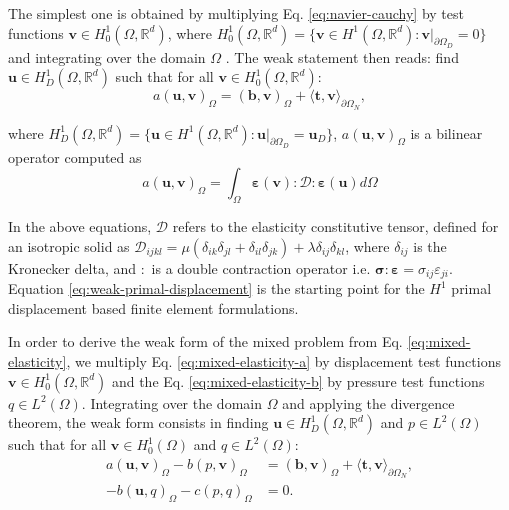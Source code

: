 \documentclass[english,11pt,3p,number,sort&compress]{elsarticle}
\begin{document}
The simplest one is obtained by multiplying Eq. \eqref{eq:navier-cauchy} by test functions $\bm{v} \in H^1_0(\Omega,\mathbb{R}^d)$, where $H^1_0(\Omega,\mathbb{R}^d)=\{\bm{v} \in H^1(\Omega,\mathbb{R}^d) : \bm{v} \lvert_{\partial\Omega_D}=0 \}$ and integrating over the domain $\Omega$ \cite{becker1981finite}. The weak statement then reads: find $\mathbf{u} \in H^1_D(\Omega,\mathbb{R}^d)$ such that for all $\mathbf{v} \in H^1_0(\Omega,\mathbb{R}^d)$:
\begin{equation} \label{eq:weak-primal-displacement}
    a\left(\bm{u},\bm{v}\right)_\Omega = \left(\bm{b},\bm{v}\right)_\Omega + \langle\bm{t},\bm{v}\rangle_{\partial\Omega_N},
\end{equation}

\noindent where $H^1_D(\Omega,\mathbb{R}^d)=\{\bm{u} \in H^1(\Omega,\mathbb{R}^d) : \bm{u} \lvert_{\partial\Omega_D}=\bm{u}_D\}$, $a\left(\bm{u},\bm{v}\right)_\Omega$ is a bilinear operator computed as
\begin{equation*}
	a\left(\bm{u},\bm{v}\right)_\Omega = \int_{\Omega} \bm{\varepsilon}(\bm{v}) : \mathcal{D} : \bm{\varepsilon}(\bm{u}) d\Omega
\end{equation*}

In the above equations, $\mathcal{D}$ refers to the elasticity constitutive tensor, defined for an isotropic solid as $\mathcal{D}_{ijkl} = \mu(\delta_{ik}\delta_{jl}+\delta_{il}\delta_{jk})+\lambda\delta_{ij}\delta_{kl}$, where $\delta_{ij}$ is the Kronecker delta, and $:$ is a double contraction operator i.e. $\bm{\sigma}:\bm{\varepsilon} = \sigma_{ij}\varepsilon_{ji}$. Equation \eqref{eq:weak-primal-displacement} is the starting point for the $H^1$ primal displacement based finite element formulations.

In order to derive the weak form of the mixed problem from Eq. \eqref{eq:mixed-elasticity}, we multiply Eq. \eqref{eq:mixed-elasticity-a} by displacement test functions $\bm{v} \in H^1_0(\Omega,\mathbb{R}^d)$ and the Eq. \eqref{eq:mixed-elasticity-b} by pressure test functions $q \in L^2(\Omega)$. Integrating over the domain $\Omega$ and applying the divergence theorem, the weak form consists in finding $\bm{u} \in H^1_D(\Omega,\mathbb{R}^d)$ and $p \in L^2(\Omega)$ such that for all $\bm{v} \in H^1_0(\Omega)$ and $q \in L^2(\Omega)$:
\begin{subequations} \label{eq:weak-mixed}
	\begin{align}
		a\left(\bm{u},\bm{v}\right)_\Omega - b\left( p, \bm{v}\right)_\Omega &= \left(\bm{b},\bm{v}\right)_\Omega + \langle\bm{t},\bm{v}\rangle_{\partial\Omega_N} ,\label{eq:weak-mixed-a}\\ 
		-b\left(\bm{u}, q\right)_\Omega - c\left(p,q \right)_\Omega &= 0 . \label{eq:weak-mixed-b}
	\end{align}
\end{subequations}
\end{document}
